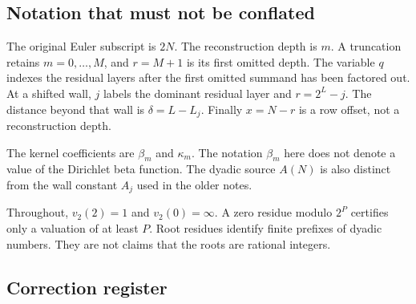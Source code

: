 \documentclass[11pt,letterpaper]{article}
\begin{document}
\subsection{Notation that must not be conflated}\label{notation-that-must-not-be-conflated}

The original Euler subscript is \(2N\). The reconstruction depth is \(m\). A truncation retains \(m=0,\ldots,M\), and \(r=M+1\) is its first omitted depth. The variable \(q\) indexes the residual layers after the first omitted summand has been factored out. At a shifted wall, \(j\) labels the dominant residual layer and \(r=2^L-j\). The distance beyond that wall is \(\delta=L-L_j\). Finally \(x=N-r\) is a row offset, not a reconstruction depth.

The kernel coefficients are \(\beta_m\) and \(\kappa_m\). The notation \(\beta_m\) here does not denote a value of the Dirichlet beta function. The dyadic source \(A(N)\) is also distinct from the wall constant \(A_j\) used in the older notes.

Throughout, \(v_2(2)=1\) and \(v_2(0)=\infty\). A zero residue modulo \(2^P\) certifies only a valuation of at least \(P\). Root residues identify finite prefixes of dyadic numbers. They are not claims that the roots are rational integers.

\subsection{Correction register}\label{correction-register}
\end{document}
